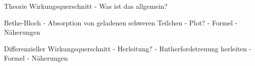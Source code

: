 Theorie
Wirkungsquerschnitt
- Was ist das allgemein?

Bethe-Bloch
- Absorption von geladenen schweren Teilchen
- Plot?
- Formel
- Näherungen

Differenzieller Wirkungsquerschnitt
- Herleitung?
- Rutherfordstreuung herleiten
- Formel
- Näherungen
